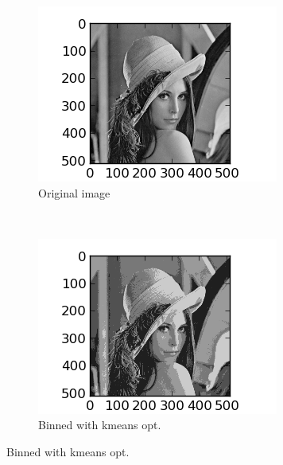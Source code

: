 \documentclass{article}
\begin{document}
    \begin{figure}
            \centering
            \begin{subfigure}[b]{0.3\textwidth}
                    \centering
                    \includegraphics[width=\textwidth]{original.png}
                    \caption{Original image}
                    \label{fig:original5}
            \end{subfigure}%
            ~ %
            \begin{subfigure}[b]{0.3\textwidth}
                    \centering
                    \includegraphics[width=\textwidth]{compressed_5.png}
                    \caption{Binned with kmeans opt.}

\end{subfigure}
\end{figure}
\end{document}
